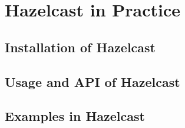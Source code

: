 
\section{Hazelcast in Practice}
\todo{}
\subsection{Installation of Hazelcast}
\todo{}
\subsection{Usage and API of Hazelcast}
\todo{}
\subsection{Examples in Hazelcast}
\todo{}